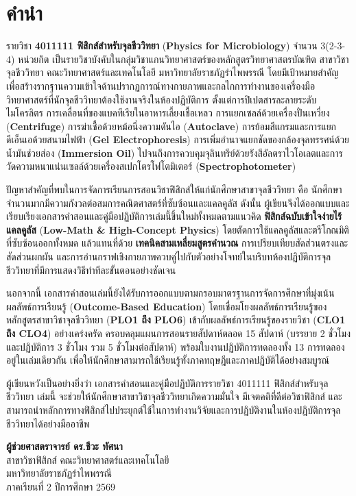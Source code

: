 \chapter*{คำนำ}

รายวิชา \textbf{4011111 ฟิสิกส์สำหรับจุลชีววิทยา} (\textbf{Physics for Microbiology}) จำนวน 3(2-3-4) หน่วยกิต เป็นรายวิชาบังคับในกลุ่มวิชาแกนวิทยาศาสตร์ของหลักสูตรวิทยาศาสตรบัณฑิต สาขาวิชาจุลชีววิทยา คณะวิทยาศาสตร์และเทคโนโลยี มหาวิทยาลัยราชภัฏรำไพพรรณี โดยมีเป้าหมายสำคัญเพื่อสร้างรากฐานความเข้าใจด้านปรากฏการณ์ทางกายภาพและกลไกการทำงานของเครื่องมือวิทยาศาสตร์ที่นักจุลชีววิทยาต้องใช้งานจริงในห้องปฏิบัติการ ตั้งแต่การปิเปตสารละลายระดับไมโครลิตร การเคลื่อนที่ของแบคทีเรียในอาหารเลี้ยงเชื้อเหลว การแยกเซลล์ด้วยเครื่องปั่นเหวี่ยง (\textbf{Centrifuge}) การฆ่าเชื้อด้วยหม้อนึ่งความดันไอ (\textbf{Autoclave}) การย้อมสีแกรมและการแยกดีเอ็นเอด้วยสนามไฟฟ้า (\textbf{Gel Electrophoresis}) การเพิ่มอำนาจแยกชัดของกล้องจุลทรรศน์ด้วยน้ำมันช่วยส่อง (\textbf{Immersion Oil}) ไปจนถึงการควบคุมจุลินทรีย์ด้วยรังสีอัลตราไวโอเลตและการวัดความหนาแน่นเซลล์ด้วยเครื่องสเปกโตรโฟโตมิเตอร์ (\textbf{Spectrophotometer})

ปัญหาสำคัญที่พบในการจัดการเรียนการสอนวิชาฟิสิกส์ให้แก่นักศึกษาสาขาจุลชีววิทยา คือ นักศึกษาจำนวนมากมีความกังวลต่อสมการคณิตศาสตร์ที่ซับซ้อนและแคลคูลัส ดังนั้น ผู้เขียนจึงได้ออกแบบและเรียบเรียงเอกสารคำสอนและคู่มือปฏิบัติการเล่มนี้ขึ้นใหม่ทั้งหมดตามแนวคิด \textbf{ฟิสิกส์ฉบับเข้าใจง่ายไร้แคลคูลัส} (\textbf{Low-Math \& High-Concept Physics}) โดยตัดการใช้แคลคูลัสและตรีโกณมิติที่ซับซ้อนออกทั้งหมด แล้วแทนที่ด้วย \textbf{เทคนิคสามเหลี่ยมสูตรคำนวณ} การเปรียบเทียบสัดส่วนตรงและสัดส่วนผกผัน และการอ่านกราฟเชิงกายภาพควบคู่ไปกับตัวอย่างโจทย์ในบริบทห้องปฏิบัติการจุลชีววิทยาที่มีการแสดงวิธีทำทีละขั้นตอนอย่างชัดเจน

นอกจากนี้ เอกสารคำสอนเล่มนี้ยังได้รับการออกแบบตามกรอบมาตรฐานการจัดการศึกษาที่มุ่งเน้นผลลัพธ์การเรียนรู้ (\textbf{Outcome-Based Education}) โดยเชื่อมโยงผลลัพธ์การเรียนรู้ของหลักสูตรสาขาวิชาจุลชีววิทยา (\textbf{PLO1 ถึง PLO6}) เข้ากับผลลัพธ์การเรียนรู้ของรายวิชา (\textbf{CLO1 ถึง CLO4}) อย่างเคร่งครัด ครอบคลุมแผนการสอนรายสัปดาห์ตลอด 15 สัปดาห์ (บรรยาย 2 ชั่วโมง และปฏิบัติการ 3 ชั่วโมง รวม 5 ชั่วโมงต่อสัปดาห์) พร้อมใบงานปฏิบัติการทดลองทั้ง 13 การทดลองอยู่ในเล่มเดียวกัน เพื่อให้นักศึกษาสามารถใช้เรียนรู้ทั้งภาคทฤษฎีและภาคปฏิบัติได้อย่างสมบูรณ์

ผู้เขียนหวังเป็นอย่างยิ่งว่า เอกสารคำสอนและคู่มือปฏิบัติการรายวิชา 4011111 ฟิสิกส์สำหรับจุลชีววิทยา เล่มนี้ จะช่วยให้นักศึกษาสาขาวิชาจุลชีววิทยาเกิดความมั่นใจ มีเจตคติที่ดีต่อวิชาฟิสิกส์ และสามารถนำหลักการทางฟิสิกส์ไปประยุกต์ใช้ในการทำงานวิจัยและการปฏิบัติงานในห้องปฏิบัติการจุลชีววิทยาได้อย่างมืออาชีพ

\vspace{1.2cm}
\begin{flushright}
    \textbf{ผู้ช่วยศาสตราจารย์ ดร.ชีวะ ทัศนา}\\[0.2cm]
    สาขาวิชาฟิสิกส์ คณะวิทยาศาสตร์และเทคโนโลยี\\
    มหาวิทยาลัยราชภัฏรำไพพรรณี\\
    ภาคเรียนที่ 2 ปีการศึกษา 2569
\end{flushright}
